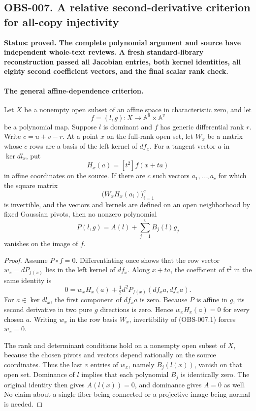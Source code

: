 \subsection{OBS-007. A relative second-derivative criterion for all-copy injectivity}
\textbf{Status: proved. The complete polynomial argument and source have
independent whole-text reviews. A fresh standard-library reconstruction
passed all Jacobian entries, both kernel identities, all eighty second
coefficient vectors, and the final scalar rank check.}

\paragraph{The general affine-dependence criterion.}
Let $X$ be a nonempty open subset of an affine space in characteristic zero,
and let
\[
 f=(l,g):X\longrightarrow \mathbb A^u\times\mathbb A^v
\]
be a polynomial map. Suppose $l$ is dominant and $f$ has generic
differential rank $r$. Write $c=u+v-r$. At a point $x$ on the full-rank
open set, let $W_x$ be a matrix whose $c$ rows are a basis of the left
kernel of $df_x$. For a tangent vector $a$ in $\ker dl_x$, put
\[
 H_x(a)=[t^2]f(x+ta)
\]
in affine coordinates on the source. If there are $c$ such vectors
$a_1,\ldots,a_c$ for which the square matrix
\[
               \bigl(W_xH_x(a_i)\bigr)_{i=1}^c
\tag{OBS-007.1}
\]
is invertible, and the vectors and kernels are defined on an open
neighborhood by fixed Gaussian pivots, then no nonzero polynomial
\[
                 P(l,g)=A(l)+\sum_{j=1}^v B_j(l)g_j
\tag{OBS-007.2}
\]
vanishes on the image of $f$.

\begin{proof}
Assume $P\circ f=0$. Differentiating once shows that the row vector
$w_x=dP_{f(x)}$ lies in the left kernel of $df_x$. Along $x+ta$, the
coefficient of $t^2$ in the same identity is
\[
 0=w_xH_x(a)+\tfrac12
          d^2P_{f(x)}(df_xa,df_xa).
\]
For $a\in\ker dl_x$, the first component of $df_xa$ is zero.
Because $P$ is affine in $g$, its second derivative in two pure
$g$ directions is zero. Hence $w_xH_x(a)=0$ for every chosen $a$.
Writing $w_x$ in the row basis $W_x$, invertibility of (OBS-007.1)
forces $w_x=0$.

The rank and determinant conditions hold on a nonempty open subset
of $X$, because the chosen pivots and vectors depend rationally on
the source coordinates. Thus the last $v$ entries of $w_x$, namely
$B_j(l(x))$, vanish on that open set. Dominance of $l$ implies that
each polynomial $B_j$ is identically zero. The original identity
then gives $A(l(x))=0$, and dominance gives $A=0$ as well. No
claim about a single fiber being connected or a projective image
being normal is needed.
\end{proof}

